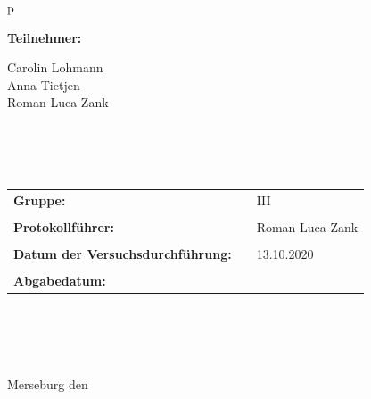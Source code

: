 \begin{center}
\begin{tabular}{p{\textwidth}}
\begin{center}
\Large{\textbf{Teilnehmer:}} \\ 
\end{center}
\begin{center}
\large{Carolin Lohmann \\
	Anna Tietjen \\
	Roman-Luca Zank} \\
\end{center}

\\ \\ \\

\begin{center}
\begin{tabular}{lll}
\large{\textbf{Gruppe:}} & & \large{III}\\
&&\\
\large{\textbf{Protokollführer:}} & & \large{Roman-Luca Zank}\\
&&\\
\large{\textbf{Datum der Versuchsdurchführung:}}&& \large{13.10.2020}\\
&&\\
\large{\textbf{Abgabedatum:}}&& \large{\todayDE}
\end{tabular}
\end{center}

\\ \\ \\ \\ 
\large{Merseburg den \todayDE}

\end{tabular}
\end{center}
